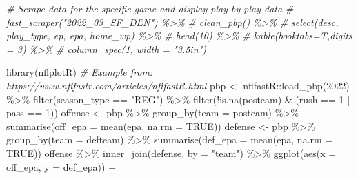 \documentclass[
  11pt,
]{book}
\newenvironment{Shaded}{\begin{snugshade}}{\end{snugshade}}
\newcommand{\AttributeTok}[1]{\textcolor[rgb]{0.77,0.63,0.00}{#1}}
\newcommand{\CommentTok}[1]{\textcolor[rgb]{0.56,0.35,0.01}{\textit{#1}}}
\newcommand{\ConstantTok}[1]{\textcolor[rgb]{0.00,0.00,0.00}{#1}}
\newcommand{\DecValTok}[1]{\textcolor[rgb]{0.00,0.00,0.81}{#1}}
\newcommand{\FunctionTok}[1]{\textcolor[rgb]{0.00,0.00,0.00}{#1}}
\newcommand{\NormalTok}[1]{#1}
\newcommand{\OtherTok}[1]{\textcolor[rgb]{0.56,0.35,0.01}{#1}}
\newcommand{\SpecialCharTok}[1]{\textcolor[rgb]{0.00,0.00,0.00}{#1}}
\newcommand{\StringTok}[1]{\textcolor[rgb]{0.31,0.60,0.02}{#1}}
\theoremstyle{definition}
\theoremstyle{definition}
\theoremstyle{definition}
\theoremstyle{definition}
\theoremstyle{remark}
\begin{document}
\newpage

\begin{Shaded}
\begin{Highlighting}[]
\CommentTok{\# Scrape data for the specific game and display play{-}by{-}play data}
\CommentTok{\# fast\_scraper("2022\_03\_SF\_DEN") \%\textgreater{}\%}
\CommentTok{\#   clean\_pbp() \%\textgreater{}\%}
\CommentTok{\#   select(desc, play\_type, ep, epa, home\_wp) \%\textgreater{}\%}
\CommentTok{\#   head(10) \%\textgreater{}\%}
\CommentTok{\#   kable(booktabs=T,digits = 3) \%\textgreater{}\%}
\CommentTok{\#   column\_spec(1, width = "3.5in")}
\end{Highlighting}
\end{Shaded}

\newpage

\begin{Shaded}
\begin{Highlighting}[]
\FunctionTok{library}\NormalTok{(nflplotR)}
\CommentTok{\# Example from: https://www.nflfastr.com/articles/nflfastR.html}
\NormalTok{pbp }\OtherTok{\textless{}{-}}\NormalTok{ nflfastR}\SpecialCharTok{::}\FunctionTok{load\_pbp}\NormalTok{(}\DecValTok{2022}\NormalTok{) }\SpecialCharTok{\%\textgreater{}\%}
  \FunctionTok{filter}\NormalTok{(season\_type }\SpecialCharTok{==} \StringTok{"REG"}\NormalTok{) }\SpecialCharTok{\%\textgreater{}\%}
  \FunctionTok{filter}\NormalTok{(}\SpecialCharTok{!}\FunctionTok{is.na}\NormalTok{(posteam) }\SpecialCharTok{\&}\NormalTok{ (rush }\SpecialCharTok{==} \DecValTok{1} \SpecialCharTok{|}\NormalTok{ pass }\SpecialCharTok{==} \DecValTok{1}\NormalTok{))}
\NormalTok{offense }\OtherTok{\textless{}{-}}\NormalTok{ pbp }\SpecialCharTok{\%\textgreater{}\%} \FunctionTok{group\_by}\NormalTok{(}\AttributeTok{team =}\NormalTok{ posteam) }\SpecialCharTok{\%\textgreater{}\%}
  \FunctionTok{summarise}\NormalTok{(}\AttributeTok{off\_epa =} \FunctionTok{mean}\NormalTok{(epa, }\AttributeTok{na.rm =} \ConstantTok{TRUE}\NormalTok{))}
\NormalTok{defense }\OtherTok{\textless{}{-}}\NormalTok{ pbp }\SpecialCharTok{\%\textgreater{}\%} \FunctionTok{group\_by}\NormalTok{(}\AttributeTok{team =}\NormalTok{ defteam) }\SpecialCharTok{\%\textgreater{}\%} 
  \FunctionTok{summarise}\NormalTok{(}\AttributeTok{def\_epa =} \FunctionTok{mean}\NormalTok{(epa, }\AttributeTok{na.rm =} \ConstantTok{TRUE}\NormalTok{))}
\NormalTok{offense }\SpecialCharTok{\%\textgreater{}\%}
  \FunctionTok{inner\_join}\NormalTok{(defense, }\AttributeTok{by =} \StringTok{"team"}\NormalTok{) }\SpecialCharTok{\%\textgreater{}\%}
  \FunctionTok{ggplot}\NormalTok{(}\FunctionTok{aes}\NormalTok{(}\AttributeTok{x =}\NormalTok{ off\_epa, }\AttributeTok{y =}\NormalTok{ def\_epa)) }\SpecialCharTok{+}

\end{Highlighting}
\end{Shaded}
\end{document}
